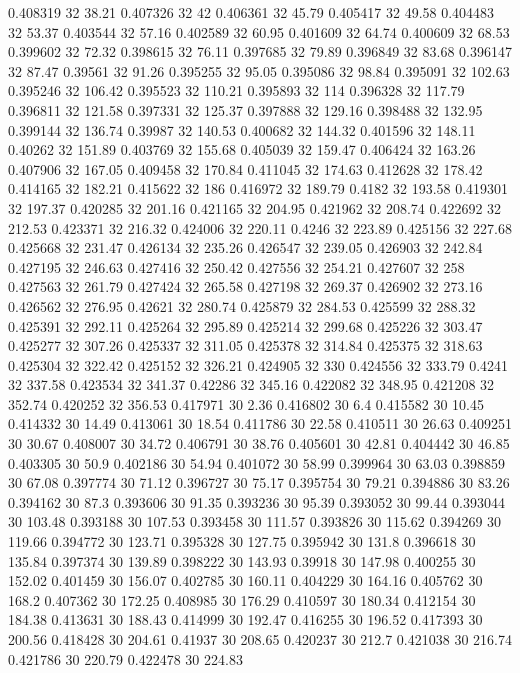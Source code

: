 0.408319 32 38.21
0.407326 32 42
0.406361 32 45.79
0.405417 32 49.58
0.404483 32 53.37
0.403544 32 57.16
0.402589 32 60.95
0.401609 32 64.74
0.400609 32 68.53
0.399602 32 72.32
0.398615 32 76.11
0.397685 32 79.89
0.396849 32 83.68
0.396147 32 87.47
0.39561 32 91.26
0.395255 32 95.05
0.395086 32 98.84
0.395091 32 102.63
0.395246 32 106.42
0.395523 32 110.21
0.395893 32 114
0.396328 32 117.79
0.396811 32 121.58
0.397331 32 125.37
0.397888 32 129.16
0.398488 32 132.95
0.399144 32 136.74
0.39987 32 140.53
0.400682 32 144.32
0.401596 32 148.11
0.40262 32 151.89
0.403769 32 155.68
0.405039 32 159.47
0.406424 32 163.26
0.407906 32 167.05
0.409458 32 170.84
0.411045 32 174.63
0.412628 32 178.42
0.414165 32 182.21
0.415622 32 186
0.416972 32 189.79
0.4182 32 193.58
0.419301 32 197.37
0.420285 32 201.16
0.421165 32 204.95
0.421962 32 208.74
0.422692 32 212.53
0.423371 32 216.32
0.424006 32 220.11
0.4246 32 223.89
0.425156 32 227.68
0.425668 32 231.47
0.426134 32 235.26
0.426547 32 239.05
0.426903 32 242.84
0.427195 32 246.63
0.427416 32 250.42
0.427556 32 254.21
0.427607 32 258
0.427563 32 261.79
0.427424 32 265.58
0.427198 32 269.37
0.426902 32 273.16
0.426562 32 276.95
0.42621 32 280.74
0.425879 32 284.53
0.425599 32 288.32
0.425391 32 292.11
0.425264 32 295.89
0.425214 32 299.68
0.425226 32 303.47
0.425277 32 307.26
0.425337 32 311.05
0.425378 32 314.84
0.425375 32 318.63
0.425304 32 322.42
0.425152 32 326.21
0.424905 32 330
0.424556 32 333.79
0.4241 32 337.58
0.423534 32 341.37
0.42286 32 345.16
0.422082 32 348.95
0.421208 32 352.74
0.420252 32 356.53
0.417971 30 2.36
0.416802 30 6.4
0.415582 30 10.45
0.414332 30 14.49
0.413061 30 18.54
0.411786 30 22.58
0.410511 30 26.63
0.409251 30 30.67
0.408007 30 34.72
0.406791 30 38.76
0.405601 30 42.81
0.404442 30 46.85
0.403305 30 50.9
0.402186 30 54.94
0.401072 30 58.99
0.399964 30 63.03
0.398859 30 67.08
0.397774 30 71.12
0.396727 30 75.17
0.395754 30 79.21
0.394886 30 83.26
0.394162 30 87.3
0.393606 30 91.35
0.393236 30 95.39
0.393052 30 99.44
0.393044 30 103.48
0.393188 30 107.53
0.393458 30 111.57
0.393826 30 115.62
0.394269 30 119.66
0.394772 30 123.71
0.395328 30 127.75
0.395942 30 131.8
0.396618 30 135.84
0.397374 30 139.89
0.398222 30 143.93
0.39918 30 147.98
0.400255 30 152.02
0.401459 30 156.07
0.402785 30 160.11
0.404229 30 164.16
0.405762 30 168.2
0.407362 30 172.25
0.408985 30 176.29
0.410597 30 180.34
0.412154 30 184.38
0.413631 30 188.43
0.414999 30 192.47
0.416255 30 196.52
0.417393 30 200.56
0.418428 30 204.61
0.41937 30 208.65
0.420237 30 212.7
0.421038 30 216.74
0.421786 30 220.79
0.422478 30 224.83
